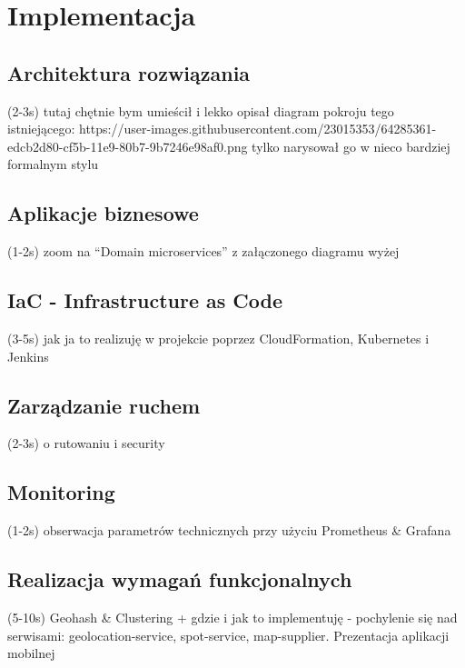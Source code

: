 \chapter{Implementacja}
\label{cha:implementation}

\section{Architektura rozwiązania}
(2-3s) tutaj chętnie bym umieścił i lekko opisał diagram pokroju tego istniejącego:
https://user-images.githubusercontent.com/23015353/64285361-edcb2d80-cf5b-11e9-80b7-9b7246e98af0.png
tylko narysował go w nieco bardziej formalnym stylu

\section{Aplikacje biznesowe}
(1-2s) zoom na “Domain microservices” z załączonego diagramu wyżej

\section{IaC - Infrastructure as Code}
(3-5s) jak ja to realizuję w projekcie poprzez CloudFormation, Kubernetes i Jenkins 

\section{Zarządzanie ruchem}
(2-3s) o rutowaniu i security

\section{Monitoring}
(1-2s) obserwacja parametrów technicznych przy użyciu Prometheus \& Grafana


\section{Realizacja wymagań funkcjonalnych}
(5-10s) Geohash \& Clustering + gdzie i jak to implementuję 
- pochylenie się nad serwisami: geolocation-service, spot-service, map-supplier. 
Prezentacja aplikacji mobilnej